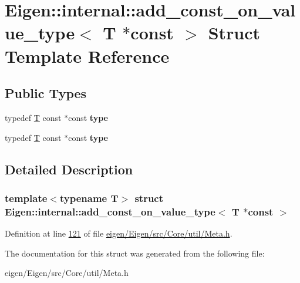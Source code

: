 \hypertarget{struct_eigen_1_1internal_1_1add__const__on__value__type_3_01_t_01_5const_01_4}{}\section{Eigen\+:\+:internal\+:\+:add\+\_\+const\+\_\+on\+\_\+value\+\_\+type$<$ T $\ast$const $>$ Struct Template Reference}
\label{struct_eigen_1_1internal_1_1add__const__on__value__type_3_01_t_01_5const_01_4}
\subsection*{Public Types}
\begin{DoxyCompactItemize}
\item 
\mbox{\label{struct_eigen_1_1internal_1_1add__const__on__value__type_3_01_t_01_5const_01_4_a5fa74c87aea5f9289253bf2936b836f3}} 
typedef \hyperlink{group___sparse_core___module}{T} const  $\ast$const {\bfseries type}
\item 
\mbox{\label{struct_eigen_1_1internal_1_1add__const__on__value__type_3_01_t_01_5const_01_4_a5fa74c87aea5f9289253bf2936b836f3}} 
typedef \hyperlink{group___sparse_core___module}{T} const  $\ast$const {\bfseries type}
\end{DoxyCompactItemize}


\subsection{Detailed Description}
\subsubsection*{template$<$typename T$>$\newline
struct Eigen\+::internal\+::add\+\_\+const\+\_\+on\+\_\+value\+\_\+type$<$ T $\ast$const $>$}



Definition at line \hyperlink{eigen_2_eigen_2src_2_core_2util_2_meta_8h_source_l00121}{121} of file \hyperlink{eigen_2_eigen_2src_2_core_2util_2_meta_8h_source}{eigen/\+Eigen/src/\+Core/util/\+Meta.\+h}.



The documentation for this struct was generated from the following file\+:\begin{DoxyCompactItemize}
\item 
eigen/\+Eigen/src/\+Core/util/\+Meta.\+h\end{DoxyCompactItemize}
